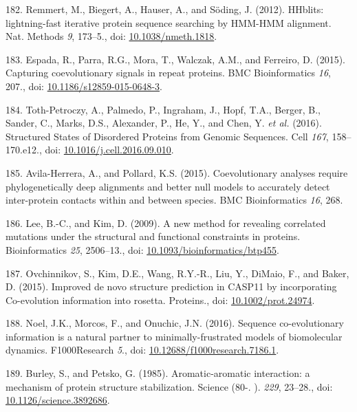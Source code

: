 \documentclass[11pt,a4paper,twoside]{book}
\theoremstyle{definition}
\theoremstyle{definition}
\theoremstyle{remark}
\begin{document}
\hypertarget{ref-Remmert2012}{}
182. Remmert, M., Biegert, A., Hauser, A., and Söding, J. (2012).
HHblits: lightning-fast iterative protein sequence searching by HMM-HMM
alignment. Nat. Methods \emph{9}, 173--5., doi:
\href{https://doi.org/10.1038/nmeth.1818}{10.1038/nmeth.1818}.

\hypertarget{ref-Espada2014}{}
183. Espada, R., Parra, R.G., Mora, T., Walczak, A.M., and Ferreiro, D.
(2015). Capturing coevolutionary signals in repeat proteins. BMC
Bioinformatics \emph{16}, 207., doi:
\href{https://doi.org/10.1186/s12859-015-0648-3}{10.1186/s12859-015-0648-3}.

\hypertarget{ref-Toth-Petroczy2016}{}
184. Toth-Petroczy, A., Palmedo, P., Ingraham, J., Hopf, T.A., Berger,
B., Sander, C., Marks, D.S., Alexander, P., He, Y., and Chen, Y.
\emph{et al.} (2016). Structured States of Disordered Proteins from
Genomic Sequences. Cell \emph{167}, 158--170.e12., doi:
\href{https://doi.org/10.1016/j.cell.2016.09.010}{10.1016/j.cell.2016.09.010}.

\hypertarget{ref-Avila-Herrera2015a}{}
185. Avila-Herrera, A., and Pollard, K.S. (2015). Coevolutionary
analyses require phylogenetically deep alignments and better null models
to accurately detect inter-protein contacts within and between species.
BMC Bioinformatics \emph{16}, 268.

\hypertarget{ref-Lee2009}{}
186. Lee, B.-C., and Kim, D. (2009). A new method for revealing
correlated mutations under the structural and functional constraints in
proteins. Bioinformatics \emph{25}, 2506--13., doi:
\href{https://doi.org/10.1093/bioinformatics/btp455}{10.1093/bioinformatics/btp455}.

\hypertarget{ref-Ovchinnikov2015b}{}
187. Ovchinnikov, S., Kim, D.E., Wang, R.Y.-R., Liu, Y., DiMaio, F., and
Baker, D. (2015). Improved de novo structure prediction in CASP11 by
incorporating Co-evolution information into rosetta. Proteins., doi:
\href{https://doi.org/10.1002/prot.24974}{10.1002/prot.24974}.

\hypertarget{ref-Noel2016}{}
188. Noel, J.K., Morcos, F., and Onuchic, J.N. (2016). Sequence
co-evolutionary information is a natural partner to minimally-frustrated
models of biomolecular dynamics. F1000Research \emph{5}., doi:
\href{https://doi.org/10.12688/f1000research.7186.1}{10.12688/f1000research.7186.1}.

\hypertarget{ref-Burley1985}{}
189. Burley, S., and Petsko, G. (1985). Aromatic-aromatic interaction: a
mechanism of protein structure stabilization. Science (80-. ).
\emph{229}, 23--28., doi:
\href{https://doi.org/10.1126/science.3892686}{10.1126/science.3892686}.
\end{document}
